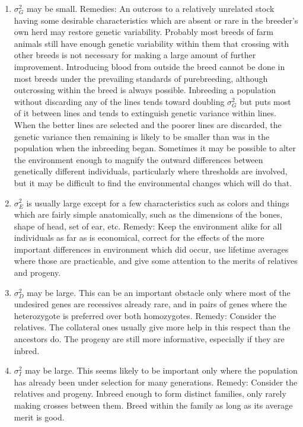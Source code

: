 \begin{enumerate}[topsep=0pt, partopsep=0pt]
\item $\sigma_G^2$ may be small. Remedies: An outcross to a relatively unrelated
stock having some desirable characteristics which are absent or
rare in the breeder's own herd may restore genetic variability. Probably
most breeds of farm animals still have enough genetic variability
within them that crossing with other breeds is not necessary for making
a large amount of further improvement. Introducing blood from outside
the breed cannot be done in most breeds under the prevailing
standards of purebreeding, although outcrossing within the breed is
always possible. Inbreeding a population without discarding any of the
lines tends toward doubling $\sigma_G^2$ but puts most of it between lines and
tends to extinguish genetic variance within lines. When the better lines
are selected and the poorer lines are discarded, the genetic variance
then remaining is likely to be smaller than was in the population when
the inbreeding began. Sometimes it may be possible to alter the environment
enough to magnify the outward differences between genetically
different individuals, particularly where thresholds are involved, but it
may be difficult to find the environmental changes which will do that.

\item $\sigma_E^2$ is usually large except for a few characteristics such as colors
and things which are fairly simple anatomically, such as the dimensions
of the bones, shape of head, set of ear, etc. Remedy: Keep the environment
alike for all individuals as far as is economical, correct for the
effects of the more important differences in environment which did
occur, use lifetime averages where those are practicable, and give some
attention to the merits of relatives and progeny.

\item $\sigma_D^2$ may be large. This can be an important obstacle only where
most of the undesired genes are recessives already rare, and in pairs of
genes where the heterozygote is preferred over both homozygotes. Remedy:
Consider the relatives. The collateral ones usually give more help
in this respect than the ancestors do. The progeny are still more
informative, especially if they are inbred.

\item $\sigma_I^2$ may be large. This seems likely to be important only where
the population has already been under selection for many generations.
Remedy: Consider the relatives and progeny. Inbreed enough to form
distinct families, only rarely making crosses between them. Breed within
the family as long as its average merit is good.
\end{enumerate}

